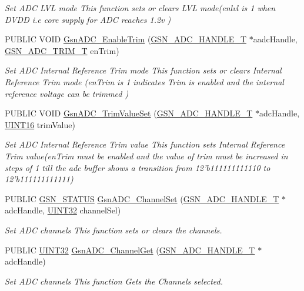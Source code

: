 \begin{DoxyCompactItemize}
\begin{DoxyCompactList}\small\item\em Set ADC LVL mode This function sets or clears LVL mode(enlvl is 1 when DVDD i.e core supply for ADC reaches 1.2v ) \end{DoxyCompactList}\item 
PUBLIC VOID \hyperlink{a00643_ga3f3ed3a3fb1e0edd943038284a38be06}{GsnADC\_\-EnableTrim} (\hyperlink{a00024}{GSN\_\-ADC\_\-HANDLE\_\-T} $\ast$aadcHandle, \hyperlink{a00643_gace83cba6b68fe265f09d30cda1ef0e63}{GSN\_\-ADC\_\-TRIM\_\-T} enTrim)
\begin{DoxyCompactList}\small\item\em Set ADC Internal Reference Trim mode This function sets or clears Internal Reference Trim mode (enTrim is 1 indicates Trim is enabled and the internal reference voltage can be trimmed ) \end{DoxyCompactList}\item 
PUBLIC VOID \hyperlink{a00643_ga1351ae6a56f6941c316e11d119052da1}{GsnADC\_\-TrimValueSet} (\hyperlink{a00024}{GSN\_\-ADC\_\-HANDLE\_\-T} $\ast$adcHandle, \hyperlink{a00660_ga09f1a1fb2293e33483cc8d44aefb1eb1}{UINT16} trimValue)
\begin{DoxyCompactList}\small\item\em Set ADC Internal Reference Trim value This function sets Internal Reference Trim value(enTrim must be enabled and the value of trim must be increased in steps of 1 till the adc buffer shows a transition from 12'b111111111110 to 12'b111111111111) \end{DoxyCompactList}\item 
PUBLIC \hyperlink{a00660_gada5951904ac6110b1fa95e51a9ddc217}{GSN\_\-STATUS} \hyperlink{a00643_gae764f1e683cbcaaf264da5f24fdca6c4}{GsnADC\_\-ChannelSet} (\hyperlink{a00024}{GSN\_\-ADC\_\-HANDLE\_\-T} $\ast$adcHandle, \hyperlink{a00660_gae1e6edbbc26d6fbc71a90190d0266018}{UINT32} channelSel)
\begin{DoxyCompactList}\small\item\em Set ADC channels This function sets or clears the channels. \end{DoxyCompactList}\item 
PUBLIC \hyperlink{a00660_gae1e6edbbc26d6fbc71a90190d0266018}{UINT32} \hyperlink{a00643_gae6a05c80cfcf90573932cc6495d652ca}{GsnADC\_\-ChannelGet} (\hyperlink{a00024}{GSN\_\-ADC\_\-HANDLE\_\-T} $\ast$adcHandle)
\begin{DoxyCompactList}\small\item\em Set ADC channels This function Gets the Channels selected. \end{DoxyCompactList}\item 

\end{DoxyCompactItemize}

